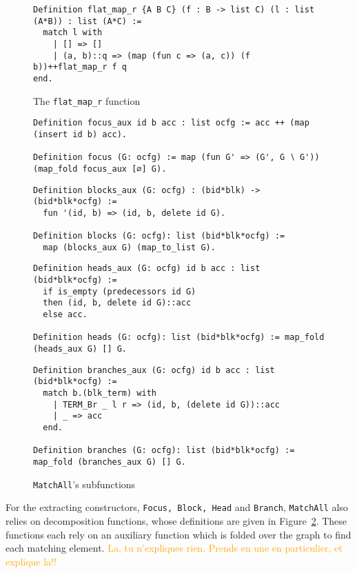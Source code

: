 \documentclass[11pt]{article}
\newcommand{\inlinecoq}[1]{\mbox{\lstinline[style=customcoq,columns=fixed,basewidth=.48em]{#1}}}
\newcommand{\ilc}[1]{\inlinecoq{#1}}
\newcommand{\gr}[1]{\textcolor{Orange}{#1}}
\begin{document}
\begin{figure}
  \begin{lstlisting}[style=customcoq,basicstyle=\small\ttfamily]
Definition flat_map_r {A B C} (f : B -> list C) (l : list (A*B)) : list (A*C) :=
  match l with
    | [] => []
    | (a, b)::q => (map (fun c => (a, c)) (f b))++flat_map_r f q
end.
  \end{lstlisting}
  \caption{The \ilc{flat_map_r} function}
  \label{fig:flatmap}
\end{figure}
\begin{figure}
  \begin{lstlisting}[style=customcoq,basicstyle=\small\ttfamily]
Definition focus_aux id b acc : list ocfg := acc ++ (map (insert id b) acc).

Definition focus (G: ocfg) := map (fun G' => (G', G ∖ G')) (map_fold focus_aux [∅] G).
  \end{lstlisting}
  
  \begin{lstlisting}[style=customcoq,basicstyle=\small\ttfamily]
Definition blocks_aux (G: ocfg) : (bid*blk) -> (bid*blk*ocfg) :=
  fun '(id, b) => (id, b, delete id G).

Definition blocks (G: ocfg): list (bid*blk*ocfg) :=
  map (blocks_aux G) (map_to_list G).
  \end{lstlisting}
  
  \begin{lstlisting}[style=customcoq,basicstyle=\small\ttfamily]
Definition heads_aux (G: ocfg) id b acc : list (bid*blk*ocfg) :=
  if is_empty (predecessors id G)
  then (id, b, delete id G)::acc
  else acc.

Definition heads (G: ocfg): list (bid*blk*ocfg) := map_fold (heads_aux G) [] G.
  \end{lstlisting}
  
  \begin{lstlisting}[style=customcoq,basicstyle=\small\ttfamily]
Definition branches_aux (G: ocfg) id b acc : list (bid*blk*ocfg) :=
  match b.(blk_term) with
    | TERM_Br _ l r => (id, b, (delete id G))::acc
    | _ => acc
  end.

Definition branches (G: ocfg): list (bid*blk*ocfg) := map_fold (branches_aux G) [] G.
  \end{lstlisting}
  \caption{\ilc{MatchAll}'s subfunctions}
  \label{fig:match_sub_funs}
\end{figure}

For the extracting constructors, \ilc{Focus, Block, Head} and \ilc{Branch}, \ilc{MatchAll} also relies on decomposition functions, whose definitions are given in Figure~\ref{fig:match_sub_funs}. These functions each rely on an auxiliary function which is folded over the graph to find each matching element.
\gr{La, tu n'expliques rien. Prends en une en particulier, et explique la!!}
\end{document}
